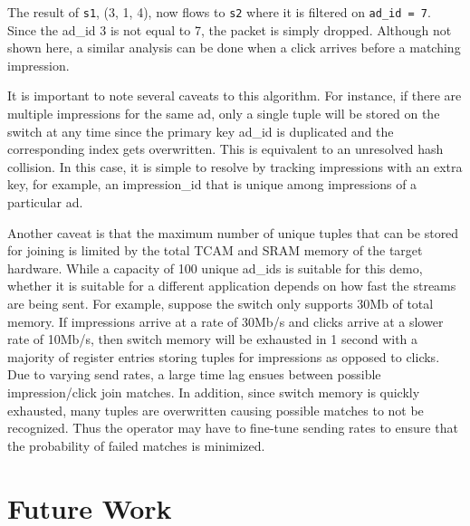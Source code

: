 \documentclass[12pt, oneside]{article}
\begin{document}
The result of \texttt{s1}, (3, 1, 4), now flows to \texttt{s2} where it is filtered on \texttt{ad\_id = 7}. Since the ad\_id 3 is not equal to 7, the packet is simply dropped. Although not shown here, a similar analysis can be done when a click arrives before a matching impression.  

It is important to note several caveats to this algorithm. For instance, if there are multiple impressions for the same ad, only a single tuple will be stored on the switch at any time since the primary key ad\_id is duplicated and the corresponding index gets overwritten. This is equivalent to an unresolved hash collision. In this case, it is simple to resolve by tracking impressions with an extra key, for example, an impression\_id that is unique among impressions of a particular ad. 

Another caveat is that the maximum number of unique tuples that can be stored for joining is limited by the total TCAM and SRAM memory of the target hardware. While a capacity of 100 unique ad\_ids is suitable for this demo, whether it is suitable for a different application depends on how fast the streams are being sent. For example, suppose the switch only supports 30Mb of total memory. If impressions arrive at a rate of 30Mb/s and clicks arrive at a slower rate of 10Mb/s, then switch memory will be exhausted in 1 second with a majority of register entries storing tuples for impressions as opposed to clicks. Due to varying send rates, a large time lag ensues between possible impression/click join matches. In addition, since switch memory is quickly exhausted, many tuples are overwritten causing possible matches to not be recognized. Thus the operator may have to fine-tune sending rates to ensure that the probability of failed matches is minimized.    

\newpage
\section{Future Work}
\end{document}
